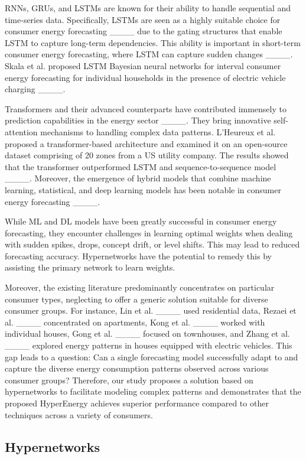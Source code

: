 RNNs, GRUs, and LSTMs are known for their ability to handle sequential and time-series data. Specifically, LSTMs are seen as a highly suitable choice for {consumer energy} forecasting ____ due to the gating structures that enable LSTM to capture long-term dependencies. This ability is important in short-term {consumer energy} forecasting, where LSTM can capture sudden changes ____. Skala et al. proposed LSTM Bayesian neural networks for interval {consumer energy} forecasting for individual households in the presence of electric vehicle charging ____.

Transformers and their advanced counterparts have contributed immensely to prediction capabilities in the energy sector ____. They bring innovative self-attention mechanisms to handling complex data patterns. L’Heureux et al. proposed a transformer-based architecture and examined it on an open-source dataset comprising of 20 zones from a US utility company. The results showed that the transformer outperformed LSTM and sequence-to-sequence model ____. Moreover, the emergence of hybrid models that combine machine learning, statistical, and deep learning models has been notable in {consumer energy} forecasting ____.

While ML and DL models have been greatly successful in {consumer energy} forecasting, they encounter challenges in learning optimal weights when dealing with sudden spikes, drops, concept drift, or level shifts. This may lead to reduced forecasting accuracy. Hypernetworks have the potential to remedy this by assisting the primary network to learn weights. 

Moreover, the existing literature predominantly concentrates on particular consumer types, neglecting to offer a generic solution suitable for diverse consumer groups.  For instance, Lin et al. ____ used residential data, Rezaei et al. ____ concentrated on apartments, Kong et al. ____ worked with individual houses, Gong et al. ____ focused on townhouses, and Zhang et al. ____ explored energy patterns in houses equipped with electric vehicles. This gap leads to a question: Can a single forecasting model successfully adapt to and capture the diverse energy consumption patterns observed across various consumer groups? Therefore, our study proposes a solution based on hypernetworks to facilitate modeling complex patterns and demonstrates that the proposed {HyperEnergy} achieves superior performance compared to other techniques across a variety of consumers. 


\subsection{Hypernetworks}

